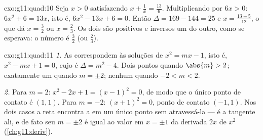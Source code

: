 \begin{solution}{exo:g11:quad:10}
Seja $x > 0$ satisfazendo $x + \frac1x = \frac{13}{6}$. Multiplicando por
$6x > 0$: $6x^2 + 6 = 13x$, isto é, $6x^2 - 13x + 6 = 0$. Então
$\Delta = 169 - 144 = 25$ e $x = \frac{13 \pm 5}{12}$, o que dá
$x = \frac32$ ou $x = \frac23$. Os dois são positivos e inversos um do
outro, como se esperava: o número é $\frac32$ (ou $\frac23$).
\end{solution}

\begin{solution}{exo:g11:quad:11}
\emph{1.} As  correspondem às soluções de $x^2 = mx - 1$,
isto é, $x^2 - mx + 1 = 0$, cujo  é $\Delta = m^2 - 4$.
Dois pontos quando $\abs{m} > 2$; exatamente um quando $m = \pm 2$;
nenhum quando $-2 < m < 2$.

\emph{2.} Para $m = 2$: $x^2 - 2x + 1 = (x-1)^2 = 0$, de modo que o
único ponto de contato é $(1, 1)$. Para $m = -2$: $(x+1)^2 = 0$, ponto
de contato $(-1, 1)$. Nos dois casos a reta encontra a  em um
único ponto sem atravessá-la --- é a tangente ali, e de fato seu
 $m = \pm 2$ é igual ao valor em $x = \pm 1$ da
derivada $2x$ de $x^2$ (\cref{ch:g11:deriv}).
\end{solution}

